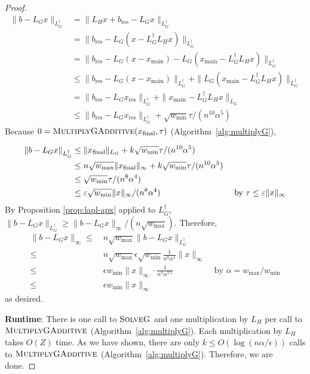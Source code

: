 \begin{proof}
\begin{align*}
\|b - L_G x\|_{L_G^{\dag}} &= \|L_H x + b_{\text{res}} - L_G x\|_{L_G^{\dag}}\\
&= \|b_{\text{res}} - L_G (x - L_G^{\dag} L_H x) \|_{L_G^{\dag}}\\
&= \|b_{\text{res}} - L_G (x - x_{\text{main}}) - L_G(x_{\text{main}} - L_G^{\dag} L_H x)\|_{L_G^{\dag}}\\
&\le \|b_{\text{res}} - L_G (x - x_{\text{main}})\|_{L_G^{\dag}} + \|L_G(x_{\text{main}} - L_G^{\dag} L_H x)\|_{L_G^{\dag}}\\
&= \|b_{\text{res}} - L_G x_{\text{res}}\|_{L_G^{\dag}} + \|x_{\text{main}} - L_G^{\dag} L_H x\|_{L_G}\\
&\le \|b_{\text{res}} - L_G x_{\text{res}}\|_{L_G^{\dag}} + \sqrt{w_{\min}}\tau/(n^{10}\alpha^5)
\end{align*}
Because $0 = \textsc{MultiplyGAdditive}(x_{\text{final}},\tau)$ (Algorithm~\ref{alg:multiplyG}),

\begin{align*}
\|b - L_G x\|_{L_G^{\dag}} &\le \|x_{\text{final}}\|_{L_G} + k\sqrt{w_{\min}}\tau/(n^{10}\alpha^5)\\
&\le n \sqrt{w_{\max}}\|x_{\text{final}}\|_{\infty} + k\sqrt{w_{\min}}\tau/(n^{10}\alpha^5)\\
&\le \sqrt{w_{\min}} \tau/(n^8 \alpha^4)\\
&\le \varepsilon \sqrt{w_{\min}} \|x\|_{\infty}/(n^8 \alpha^4) & \text{~by~} \tau \leq \varepsilon \| x \|_{\infty}
\end{align*}
By Proposition \ref{prop:lapl-apx} applied to $L_G^{\dag}$, $\|b - L_Gx\|_{L_G^{\dag}} \ge \|b - L_Gx\|_{\infty}/(n\sqrt{w_{\max}} )$. 
Therefore,
\begin{align*}\|b - L_Gx\|_{\infty} 
\leq & ~ n \sqrt{w_{\max}} \| b - L_G x \|_{L_G^\dag} \\
\leq & ~ n \sqrt{w_{\max}} \epsilon \sqrt{w_{\min}} \frac{1}{n^8 \alpha^4} \| x \|_{\infty} \\
\leq & ~ \epsilon w_{\min} \|x\|_{\infty} \cdot \frac{1}{n^7 \alpha^{3.5}} & \text{~by~} \alpha = w_{\max} / w_{\min} \\
\leq & ~ \epsilon w_{\min}   \|x\|_{\infty}
\end{align*}
as desired.

\textbf{Runtime}: There is one call to $\textsc{SolveG}$ and one multiplication by $L_H$ per call to $\textsc{MultiplyGAdditive}$ (Algorithm~\ref{alg:multiplyG}). Each multiplication by $L_H$ takes $O(Z)$ time. As we have shown, there are only $k\le O(\log (n\alpha/\epsilon))$ calls to $\textsc{MultiplyGAdditive}$ (Algorithm~\ref{alg:multiplyG}). Therefore, we are done.
\end{proof}

